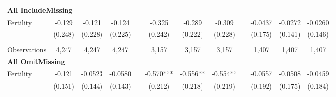\begin{landscape}
\begin{table}[htpb!]
\begin{center}
\begin{tabular}{lcccp{2mm}cccp{2mm}ccc}
\multicolumn{12}{l}{\textbf{All IncludeMissing}}\\ 
Fertility&-0.129&-0.121&-0.124&&-0.325&-0.289&-0.309&&-0.0437&-0.0272&-0.0260\\
&(0.248)&(0.228)&(0.225)&&(0.242)&(0.222)&(0.228)&&(0.175)&(0.141)&(0.146)\\
\begin{footnotesize}\end{footnotesize}&\begin{footnotesize}\end{footnotesize}&\begin{footnotesize}\end{footnotesize}&\begin{footnotesize}\end{footnotesize}&\begin{footnotesize}\end{footnotesize}&\begin{footnotesize}\end{footnotesize}&\begin{footnotesize}\end{footnotesize}&\begin{footnotesize}\end{footnotesize}&\begin{footnotesize}\end{footnotesize}&\begin{footnotesize}\end{footnotesize}&\begin{footnotesize}\end{footnotesize}&\begin{footnotesize}\end{footnotesize}\\Observations&4,247&4,247&4,247&&3,157&3,157&3,157&&1,407&1,407&1,407\\
\multicolumn{12}{l}{\textbf{All OmitMissing}}\\ 
Fertility&-0.121&-0.0523&-0.0580&&-0.570***&-0.556**&-0.554**&&-0.0557&-0.0508&-0.0459\\
&(0.151)&(0.144)&(0.143)&&(0.212)&(0.218)&(0.219)&&(0.192)&(0.175)&(0.184)\\

\end{tabular}
\end{center}
\end{table}
\end{landscape}
